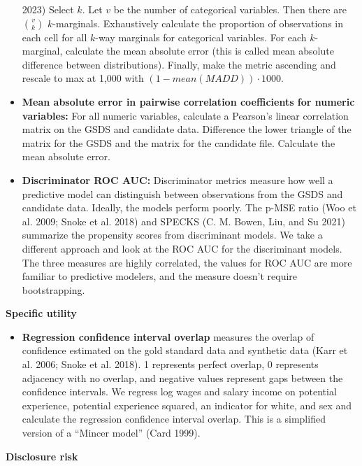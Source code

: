 \documentclass[
]{urban-formatting}
\providecommand{\tightlist}{%
  \setlength{\itemsep}{0pt}\setlength{\parskip}{0pt}}\usepackage{longtable,booktabs,array}
\begin{document}
\begin{itemize}
  2023) Select \(k\). Let \(v\) be the number of categorical variables.
  Then there are \({v \choose k}\) \(k\)-marginals. Exhaustively
  calculate the proportion of observations in each cell for all
  \(k\)-way marginals for categorical variables. For each
  \(k\)-marginal, calculate the mean absolute error (this is called mean
  absolute difference between distributions). Finally, make the metric
  ascending and rescale to max at 1,000 with
  \((1 - mean(MADD)) \cdot 1000\).
\item
  \textbf{Mean absolute error in pairwise correlation coefficients for
  numeric variables:} For all numeric variables, calculate a Pearson's
  linear correlation matrix on the GSDS and candidate data. Difference
  the lower triangle of the matrix for the GSDS and the matrix for the
  candidate file. Calculate the mean absolute error.
\item
  \textbf{Discriminator ROC AUC:} Discriminator metrics measure how well
  a predictive model can distinguish between observations from the GSDS
  and candidate data. Ideally, the models perform poorly. The p-MSE
  ratio (Woo et al. 2009; Snoke et al. 2018) and SPECKS (C. M. Bowen,
  Liu, and Su 2021) summarize the propensity scores from discriminant
  models. We take a different approach and look at the ROC AUC for the
  discriminant models. The three measures are highly correlated, the
  values for ROC AUC are more familiar to predictive modelers, and the
  measure doesn't require bootstrapping.
\end{itemize}

\textbf{Specific utility}

\begin{itemize}
\tightlist
\item
  \textbf{Regression confidence interval overlap} measures the overlap
  of confidence estimated on the gold standard data and synthetic data
  (Karr et al. 2006; Snoke et al. 2018). 1 represents perfect overlap, 0
  represents adjacency with no overlap, and negative values represent
  gaps between the confidence intervals. We regress log wages and salary
  income on potential experience, potential experience squared, an
  indicator for white, and sex and calculate the regression confidence
  interval overlap. This is a simplified version of a ``Mincer model''
  (Card 1999).
\end{itemize}

\textbf{Disclosure risk}
\end{document}
